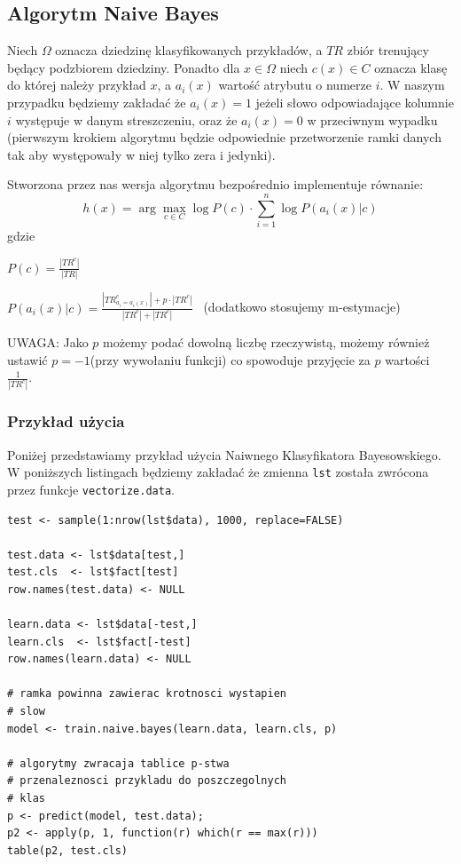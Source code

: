 \documentclass[a4paper,12pt]{article}
\begin{document}
	
	\subsection{Algorytm Naive Bayes}
		Niech $\Omega$ oznacza dziedzinę klasyfikowanych przykładów,
	a $TR$ zbiór trenujący będący podzbiorem dziedziny.
	Ponadto dla $x \in \Omega$ niech
	$c(x) \in C$ oznacza klasę do której należy przykład $x$,
	a $a_i(x)$ wartość atrybutu o numerze $i$.
	W naszym przypadku będziemy zakładać że $a_i(x) = 1$ jeżeli słowo
	odpowiadające kolumnie $i$ występuje w danym streszczeniu, oraz
	że $a_i(x) = 0$ w przeciwnym wypadku (pierwszym krokiem algorytmu
	będzie odpowiednie przetworzenie ramki danych tak aby
	występowały w niej tylko zera i jedynki).
	
	Stworzona przez nas wersja algorytmu bezpośrednio
	implementuje równanie:
	\[ h(x) = \arg\max_{c \in C}{
		\log P(c) \cdot \sum_{i=1}^{n} \log P(a_i(x)|c)	
	} \]
	gdzie
	\begin{list}{}{}
		\item
			$P(c) = \frac{|TR^c|}{|TR|}$
		\item
			$P(a_i(x)|c) = \frac{|TR_{a_i = a_i(x)}^c| + p\cdot |TR^c|}{|TR^c| + |TR^c|}$ \  (dodatkowo stosujemy m-estymacje)
	
	\end{list}
	
	
	\textsc{UWAGA}: Jako $p$ możemy podać dowolną liczbę rzeczywistą,
	możemy również ustawić $p = -1$(przy wywołaniu funkcji) co spowoduje przyjęcie za $p$ wartości $\frac{1}{|TR^c|}$.
		
		
		\subsubsection{Przykład użycia}
		Poniżej przedstawiamy przykład użycia Naiwnego Klasyfikatora Bayesowskiego.
		W poniższych listingach będziemy zakładać że zmienna \texttt{lst}
		została zwrócona przez funkcje \texttt{vectorize.data}.
		\begin{verbatim}
test <- sample(1:nrow(lst$data), 1000, replace=FALSE)

test.data <- lst$data[test,]
test.cls  <- lst$fact[test]
row.names(test.data) <- NULL

learn.data <- lst$data[-test,]
learn.cls  <- lst$fact[-test]
row.names(learn.data) <- NULL

# ramka powinna zawierac krotnosci wystapien
# slow
model <- train.naive.bayes(learn.data, learn.cls, p)

# algorytmy zwracaja tablice p-stwa
# przenaleznosci przykladu do poszczegolnych
# klas
p <- predict(model, test.data);
p2 <- apply(p, 1, function(r) which(r == max(r)))
table(p2, test.cls)
		\end{verbatim}
	
\end{document}
